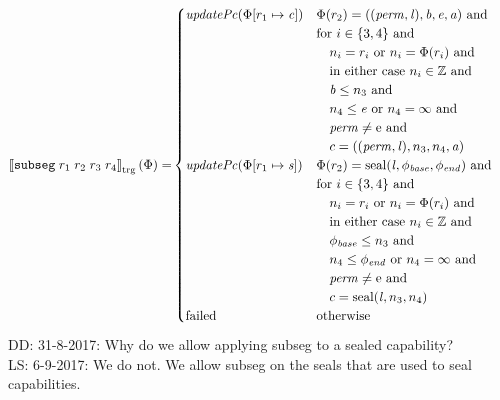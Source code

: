 \documentclass[a4paper]{article}
\newcommand\lau[1]{{\color{purple} \sf \footnotesize {LS: #1}}\\}
\newcommand\dominique[1]{{\color{purple} \sf \footnotesize {DD: #1}}\\}
\newcommand{\sem}[1]{\left\llbracket #1 \right\rrbracket}
\newcommand{\tsem}[2][\Phi]{\sem{#2}_{\mathrm{trg}}(#1)}
\newcommand{\tand}{\text{ and }}
\newcommand{\totherwise}{\text{otherwise }}
\newcommand{\targetcolor}[1]{\color{black}}
\newcommand{\trg}[1]{{\targetcolor{} #1}}
\newcommand{\zinstr}[1]{\texttt{#1}}
\newcommand{\fourinstr}[5]{
  \ifthenelse{\equal{#2#3#4#5}{}}
  {\zinstr{#1}}
  {\zinstr{#1} \; #2 \; #3 \; #4 \; #5}
}
\newcommand{\tsubseg}[4]{\fourinstr{\trg{subseg}}{#1}{#2}{#3}{#4}}
\newcommand{\ints}{\mathbb{Z}}
\newcommand{\update}[2]{[#1 \mapsto #2]}
\newcommand{\shareddom}[1]{\mathrm{#1}}
\newcommand{\perm}{\var{perm}}
\newcommand{\lin}{\var{l}}
\newcommand{\seal}[1]{\shareddom{seal}(#1)}
\newcommand{\failed}{\mathrm{failed}}
\newcommand{\var}[1]{\mathit{#1}}
\newcommand{\baddr}{\var{b}}
\newcommand{\eaddr}{\var{e}}
\newcommand{\aaddr}{\var{a}}
\newcommand{\plainperm}[1]{\mathrm{#1}}
\newcommand{\enter}{\plainperm{e}}
\newcommand{\plainfun}[2]{
  \ifthenelse{\equal{#2}{}}
  {\mathit{#1}}
  {\mathit{#1}(#2)}
}
\newcommand{\updPcAddr}[1]{\plainfun{updatePc}{#1}}
\begin{document}
\begin{align*}
  \tsem{\tsubseg{r_1}{r_2}{r_3}{r_4}} = &
                                     \begin{cases}
                                       \updPcAddr{\Phi\update{r_1}{\var{c}}} &
                                       \arraycolsep=0pt
                                       \begin{array}[t]{l}
                                         \Phi(r_2) = ((\perm,\lin),\baddr, \eaddr, \aaddr) \tand \\
                                         \text{for $i \in \{3,4\}$ and} \\
                                         \quad n_i = r_i \text{ or } n_i = \Phi(r_i) \tand \\
                                         \quad \text{in either case $n_i \in \ints$ and} \\
                                         \quad \baddr \leq n_3 \tand \\
                                         \quad n_4 \leq \eaddr \text{ or } n_4 = \infty \tand \\
                                         \quad \perm \neq \enter \tand \\
                                         \quad c = ((\perm,\lin),n_3,n_4,\aaddr)
                                       \end{array} \\
                                       \updPcAddr{\Phi\update{r_1}{\var{s}}} &
                                       \arraycolsep=0pt
                                       \begin{array}[t]{l}
                                         \Phi(r_2) = \seal{\lin,\phi_{\var{base}},\phi_{\var{end}}} \tand \\
                                         \text{for $i \in \{3,4\}$ and} \\
                                         \quad n_i = r_i \text{ or } n_i = \Phi(r_i) \tand \\
                                         \quad \text{in either case $n_i \in \ints$ and} \\
                                         \quad \phi_{\var{base}} \leq n_3 \tand \\
                                         \quad n_4 \leq \phi_{\var{end}} \text{ or } n_4 = \infty \tand \\
                                         \quad \perm \neq \enter \tand \\
                                         \quad c = \seal{\lin, n_3,n_4}
                                       \end{array} \\
                                       \failed & \totherwise
                                     \end{cases}
\end{align*}
\dominique{31-8-2017: Why do we allow applying subseg to a sealed capability?}
\lau{6-9-2017: We do not. We allow subseg on the seals that are used to seal capabilities.}
\end{document}

